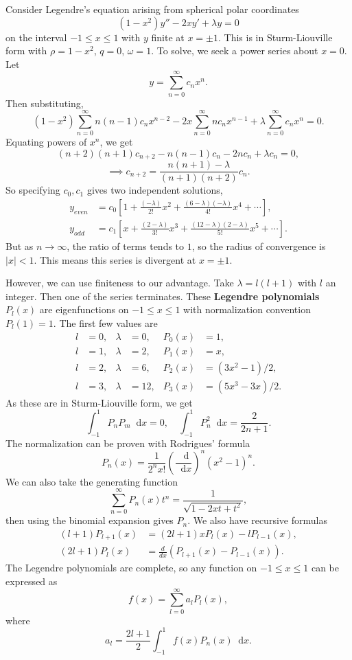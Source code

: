 \documentclass[12pt]{article}
\newcommand{\diff}{\mathop{}\!\mathrm{d}}
\theoremstyle{definition}
\theoremstyle{remark}
\begin{document}
Consider Legendre's equation arising from spherical polar coordinates
\[
	(1 - x^2)y'' - 2xy' + \lambda y = 0
\]
on the interval $-1 \leq x \leq 1$ with $y$ finite at $x = \pm 1$. This is in Sturm-Liouville form with $\rho = 1-x^2$, $q = 0$, $\omega = 1$. To solve, we seek a power series about $x = 0$. Let
\[
y = \sum_{n = 0}^{\infty} c_n x^{n}
.\]
Then substituting,
\[
	(1 - x^2)\sum_{n = 0}^{\infty} n(n-1) c_n x^{n-2} - 2x \sum_{n = 0}^{\infty} n c_n x^{n-1} + \lambda \sum_{n = 0}^{\infty} c_n x^{n} = 0
.\]
Equating powers of $x^{n}$, we get
\[
	(n+2)(n+1)c_{n+2} - n(n-1)c_n - 2n c_n + \lambda c_n = 0
,\]
\[
	\implies c_{n+2} = \frac{n(n+1) - \lambda}{(n+1)(n+2)} c_n
.\]
So specifying $c_0, c_1$ gives two independent solutions,
\begin{align*}
	y_{even} &= c_0 \left[ 1 + \frac{(-\lambda)}{2!}x^2 + \frac{(6 - \lambda)(-\lambda)}{4!}x^{4} + \cdots \right], \\
	y_{odd} &= c_1 \left[x + \frac{(2 - \lambda)}{3!}x^3 + \frac{(12 - \lambda)(2 - \lambda)}{5!}x^{5} + \cdots \right].
\end{align*}
But as $n \to \infty$, the ratio of terms tends to $1$, so the radius of convergence is $|x| < 1$. This means this series is divergent at $x = \pm 1$.

However, we can use finiteness to our advantage. Take $\lambda = l(l+1)$ with $l$ an integer. Then one of the series terminates. These \textbf{Legendre polynomials} $P_l(x)$ are eigenfunctions on $-1 \leq x \leq 1$ with normalization convention $P_l(1) = 1$. The first few values are
\begin{align*}
	l &= 0, & \lambda &= 0, & P_0(x) &= 1, \\
	l &= 1, & \lambda &= 2, & P_1(x) &= x, \\
	l &= 2, & \lambda &= 6, & P_2(x) &= (3x^2-1)/2, \\
	l &= 3, & \lambda &= 12, & P_3(x) &= (5x^3 - 3x)/2.
\end{align*}
As these are in Sturm-Liouville form, we get
\[
\int_{-1}^{1}P_n P_m\diff x = 0, \quad \int_{-1}^{1}P_n^2\diff x = \frac{2}{2n+1}
.\]
The normalization can be proven with Rodrigues' formula
\[
	P_n(x) = \frac{1}{2^{n}x!} \left( \frac{\diff}{\diff x} \right)^{n} (x^2 - 1)^{n}
.\]
We can also take the generating function
\[
	\sum_{n = 0}^{\infty} P_n(x)t^{n} = \frac{1}{\sqrt{1 - 2xt + t^2}}
,\]
then using the binomial expansion gives $P_n$. We also have recursive formulas
\begin{align*}
	(l+1)P_{l+1}(x) &= (2l+1)xP_l(x) - lP_{l-1}(x), \\
	(2l+1)P_{l}(x) &= \frac{d}{dx} (P_{l+1}(x) - P_{l-1}(x)).
\end{align*}
The Legendre polynomials are complete, so any function on $-1 \leq x \leq 1$ can be expressed as
\[
	f(x) = \sum_{l = 0}^{\infty} a_l P_l(x)
,\]
where
\[
	a_l = \frac{2l+1}{2} \int_{-1}^{1}f(x) P_n(x)\diff x
.\]
\end{document}
